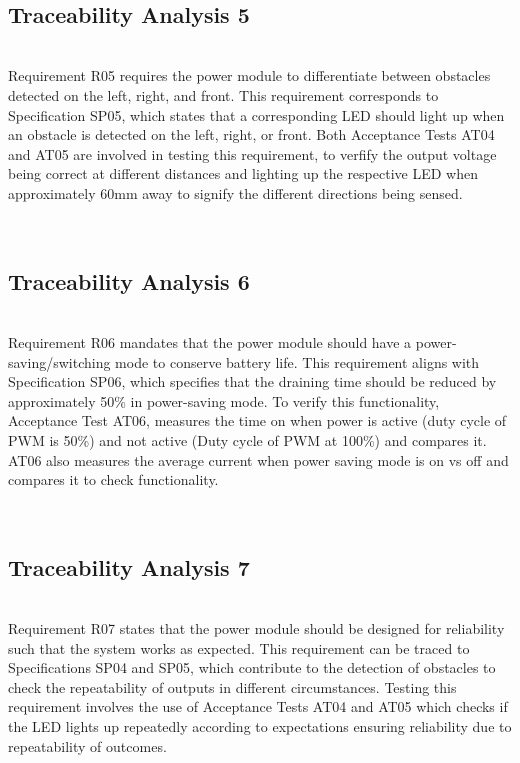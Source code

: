 \documentclass[class=report,11pt,crop=false]{standalone}
\begin{document}
\\ \subsection{Traceability Analysis 5} \\
Requirement R05 requires the power module to differentiate between obstacles detected on the left, right, and front. This requirement corresponds to Specification SP05, which states that a corresponding LED should light up when an obstacle is detected on the left, right, or front. Both Acceptance Tests AT04 and AT05 are involved in testing this requirement, to verfify the output voltage being correct at different distances and lighting up the respective LED when approximately 60mm away to signify the different directions being sensed.

\\ \subsection{Traceability Analysis 6} \\
Requirement R06 mandates that the power module should have a power-saving/switching mode to conserve battery life. This requirement aligns with Specification SP06, which specifies that the draining time should be reduced by approximately 50\% in power-saving mode. To verify this functionality, Acceptance Test AT06, measures the time on when power is active (duty cycle of PWM is 50\%) and not active (Duty cycle of PWM at 100\%) and compares it. AT06 also measures the average current when power saving mode is on vs off and compares it to check functionality.

\\ \subsection{Traceability Analysis 7} \\
Requirement R07 states that the power module should be designed for reliability such that the system works as expected. This requirement can be traced to Specifications SP04 and SP05, which contribute to the detection of obstacles to check the repeatability of outputs in different circumstances. Testing this requirement involves the use of Acceptance Tests AT04 and AT05 which checks if the LED lights up repeatedly according to expectations ensuring reliability due to repeatability of outcomes.




\ifstandalone

\fi
\end{document}
